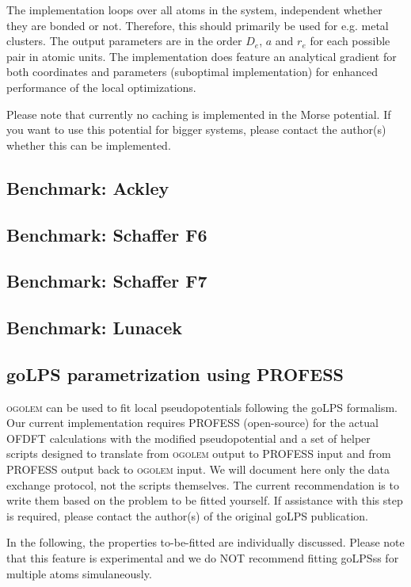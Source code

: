 \documentclass[a4paper,10pt]{scrbook}
\newcommand{\ogo}{\textsc{ogolem}}
\begin{document}
The implementation loops over all atoms in the system, independent whether they
are bonded or not. Therefore, this should primarily be used for e.g. metal
clusters. The output parameters are in the order $D_e$, $a$ and $r_e$ for each
possible pair in atomic units. The implementation does feature an analytical
gradient for both coordinates and parameters (suboptimal implementation) for
enhanced performance of the local optimizations.

Please note that currently no caching is implemented in the Morse potential. If
you want to use this potential for bigger systems, please contact the author(s)
whether this can be implemented.

\subsection{Benchmark: Ackley}

\subsection{Benchmark: Schaffer F6}

\subsection{Benchmark: Schaffer F7}

\subsection{Benchmark: Lunacek}

\subsection{goLPS parametrization using PROFESS}
\ogo{} can be used to fit local pseudopotentials following the goLPS formalism. Our
current implementation requires PROFESS (open-source) for the actual OFDFT calculations
with the modified pseudopotential and a set of helper scripts designed to translate
from \ogo{} output to PROFESS input and from PROFESS output back to \ogo{} input.
We will document here only the data exchange protocol, not the scripts themselves.
The current recommendation is to write them based on the problem to be fitted yourself.
If assistance with this step is required, please contact the author(s) of the
original goLPS publication.

In the following, the properties to-be-fitted are individually discussed. Please note
that this feature is experimental and we do NOT recommend fitting goLPSss for multiple
atoms simulaneously.
\end{document}
